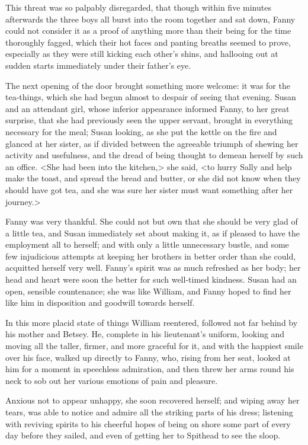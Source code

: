 This threat was so palpably disregarded, that though within five minutes afterwards the three boys all burst into the room together and sat down, Fanny could not consider it as a proof of anything more than their being for the time thoroughly fagged, which their hot faces and panting breaths seemed to prove, especially as they were still kicking each other's shins, and hallooing out at sudden starts immediately under their father's eye.

The next opening of the door brought something more welcome: it was for the tea-things, which she had begun almost to despair of seeing that evening. Susan and an attendant girl, whose inferior appearance informed Fanny, to her great surprise, that she had previously seen the upper servant, brought in everything necessary for the meal; Susan looking, as she put the kettle on the fire and glanced at her sister, as if divided between the agreeable triumph of shewing her activity and usefulness, and the dread of being thought to demean herself by such an office. <She had been into the kitchen,> she said, <to hurry Sally and help make the toast, and spread the bread and butter, or she did not know when they should have got tea, and she was sure her sister must want something after her journey.>

Fanny was very thankful. She could not but own that she should be very glad of a little tea, and Susan immediately set about making it, as if pleased to have the employment all to herself; and with only a little unnecessary bustle, and some few injudicious attempts at keeping her brothers in better order than she could, acquitted herself very well. Fanny's spirit was as much refreshed as her body; her head and heart were soon the better for such well-timed kindness. Susan had an open, sensible countenance; she was like William, and Fanny hoped to find her like him in disposition and goodwill towards herself.

In this more placid state of things William reentered, followed not far behind by his mother and Betsey. He, complete in his lieutenant's uniform, looking and moving all the taller, firmer, and more graceful for it, and with the happiest smile over his face, walked up directly to Fanny, who, rising from her seat, looked at him for a moment in speechless admiration, and then threw her arms round his neck to sob out her various emotions of pain and pleasure.

Anxious not to appear unhappy, she soon recovered herself; and wiping away her tears, was able to notice and admire all the striking parts of his dress; listening with reviving spirits to his cheerful hopes of being on shore some part of every day before they sailed, and even of getting her to Spithead to see the sloop.

